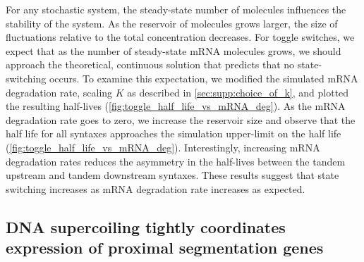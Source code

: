 \documentclass[11pt]{article}
\begin{document}
For any stochastic system, the steady-state number of molecules influences the stability of the system. As the reservoir of molecules grows larger, the size of fluctuations relative to the total concentration decreases. For toggle switches, we expect that as the number of steady-state mRNA molecules grows, we should approach the theoretical, continuous solution that predicts that no state-switching occurs. To examine this expectation, we modified the simulated mRNA degradation rate, scaling \(K\) as described in \cref{sec:supp:choice_of_k}, and plotted the resulting half-lives (\cref{fig:toggle_half_life_vs_mRNA_deg}).
As the mRNA degradation rate goes to zero, we increase the reservoir size and observe that the half life for all syntaxes approaches the simulation upper-limit on the half life (\cref{fig:toggle_half_life_vs_mRNA_deg}).  Interestingly, increasing mRNA degradation rates reduces the asymmetry in the half-lives between the tandem upstream and tandem downstream syntaxes. These results suggest that state switching increases as mRNA degradation rate increases as expected.


\subsection{DNA supercoiling tightly coordinates expression of proximal segmentation genes}
\end{document}
